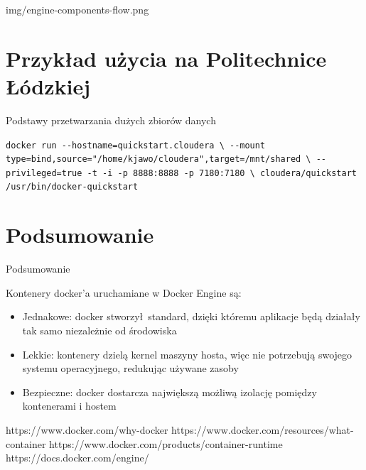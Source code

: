 \documentclass[aspectratio=169]{beamer}
\begin{document}
\begin{frameImg}[\textwidth]{img/engine-components-flow.png}
\end{frameImg}

\section{Przykład użycia na Politechnice Łódzkiej}
\begin{frame}
    \begin{card}
        Podstawy przetwarzania dużych zbiorów danych
    \end{card}

    \begin{cardTiny}
        \colorbox{dark-gray}{\lstinline[breaklines=true]{docker run --hostname=quickstart.cloudera \ --mount type=bind,source="/home/kjawo/cloudera",target=/mnt/shared \ --privileged=true -t -i -p 8888:8888 -p 7180:7180 \ cloudera/quickstart /usr/bin/docker-quickstart}}
    \end{cardTiny}
\end{frame}

\section{Podsumowanie}
\begin{frame}{Podsumowanie}
    \begin{card}
        Kontenery docker'a uruchamiane w Docker Engine są:
        \begin{itemize}
            \item Jednakowe: docker stworzył standard, dzięki któremu aplikacje będą działały tak samo niezależnie od środowiska
            \item Lekkie: kontenery dzielą kernel maszyny hosta, więc nie potrzebują swojego systemu operacyjnego, redukując używane zasoby
            \item Bezpieczne: docker dostarcza największą możliwą izolację pomiędzy kontenerami i hostem
        \end{itemize}
    \end{card}
\end{frame}



https://www.docker.com/why-docker
https://www.docker.com/resources/what-container
https://www.docker.com/products/container-runtime
https://docs.docker.com/engine/
\end{document}
